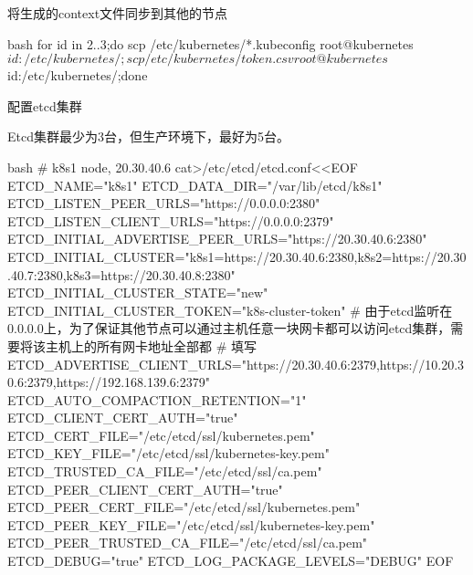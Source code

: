 \begin{outline}[enumerate]
将生成的context文件同步到其他的节点
\begin{code-block}{bash}
for id in {2..3};do scp /etc/kubernetes/*.kubeconfig root@kubernetes$id:/etc/kubernetes/; scp /etc/kubernetes/token.csv root@kubernetes$id:/etc/kubernetes/;done
\end{code-block}

  \1 配置etcd集群

Etcd集群最少为3台，但生产环境下，最好为5台。
\begin{code-block}{bash}
# k8s1 node, 20.30.40.6
cat>/etc/etcd/etcd.conf<<EOF
ETCD_NAME="k8s1"
ETCD_DATA_DIR="/var/lib/etcd/k8s1"
ETCD_LISTEN_PEER_URLS="https://0.0.0.0:2380"
ETCD_LISTEN_CLIENT_URLS="https://0.0.0.0:2379"
ETCD_INITIAL_ADVERTISE_PEER_URLS="https://20.30.40.6:2380"
ETCD_INITIAL_CLUSTER="k8s1=https://20.30.40.6:2380,k8s2=https://20.30.40.7:2380,k8s3=https://20.30.40.8:2380"
ETCD_INITIAL_CLUSTER_STATE="new"
ETCD_INITIAL_CLUSTER_TOKEN="k8s-cluster-token"
# 由于etcd监听在0.0.0.0上，为了保证其他节点可以通过主机任意一块网卡都可以访问etcd集群，需要将该主机上的所有网卡地址全部都
# 填写
ETCD_ADVERTISE_CLIENT_URLS="https://20.30.40.6:2379,https://10.20.30.6:2379,https://192.168.139.6:2379"
ETCD_AUTO_COMPACTION_RETENTION="1"
ETCD_CLIENT_CERT_AUTH="true"
ETCD_CERT_FILE="/etc/etcd/ssl/kubernetes.pem"
ETCD_KEY_FILE="/etc/etcd/ssl/kubernetes-key.pem"
ETCD_TRUSTED_CA_FILE="/etc/etcd/ssl/ca.pem"
ETCD_PEER_CLIENT_CERT_AUTH="true"
ETCD_PEER_CERT_FILE="/etc/etcd/ssl/kubernetes.pem"
ETCD_PEER_KEY_FILE="/etc/etcd/ssl/kubernetes-key.pem"
ETCD_PEER_TRUSTED_CA_FILE="/etc/etcd/ssl/ca.pem"
ETCD_DEBUG="true"
ETCD_LOG_PACKAGE_LEVELS="DEBUG"
EOF


\end{code-block}
\end{outline}
